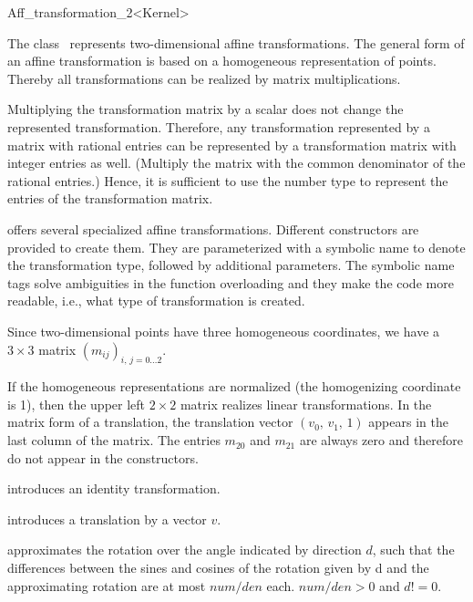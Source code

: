 \begin{ccRefClass}{Aff_transformation_2<Kernel>}

\ccDefinition
The class \ccRefName\ represents two-dimensional affine transformations. 
The general form of an affine transformation is based on a homogeneous
representation of points. Thereby all transformations can be realized by
matrix multiplications. 

Multiplying the transformation matrix by a scalar does not change the
represented transformation. Therefore, any transformation represented
by a matrix with rational entries can be represented by a
transformation matrix with integer entries as well. (Multiply the
matrix with the common denominator of the rational entries.) Hence, it
is sufficient to use the number type  to represent
the entries of the transformation matrix.

{\cgal} offers several specialized affine transformations. Different
constructors are provided to create them. They are parameterized with
a symbolic name to denote the transformation type, followed by
additional parameters. The symbolic name tags solve ambiguities in the
function overloading and they make the code more readable, i.e., what
type of transformation is created.

Since two-dimensional points have three homogeneous coordinates, we
have a $3\times 3$ matrix ${(m_{ij})}_{i,\,j=0\ldots 2}$.

If the homogeneous representations are normalized (the homogenizing
coordinate is 1), then the upper left $2\times 2$ matrix realizes
linear transformations. In the matrix form of a translation, the
translation vector $(v_0,\,v_1,\,1)$ appears in the last column of the
matrix. The entries $m_{20}$ and $m_{21}$ are always zero and
therefore do not appear in the constructors.

\ccCreation
{}

            {introduces an identity transformation.}

            {introduces a translation by a vector $v$.}

            {approximates the rotation over the angle indicated by direction 
             $d$, such that the differences between the sines and cosines
             of the rotation given by d and the approximating rotation
             are at most $num/den$ each.
             \ccPrecond $num/den>0$ and $d != 0$. }


\end{ccRefClass}
